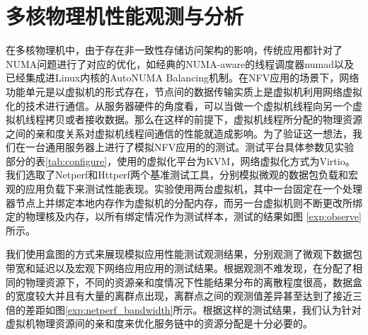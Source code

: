 \section{多核物理机性能观测与分析}
在多核物理机中，由于存在非一致性存储访问架构的影响，传统应用都针对了NUMA问题进行了对应的优化，如经典的NUMA-aware的线程调度器numad以及已经集成进Linux内核的AutoNUMA Balancing机制。在NFV应用的场景下，网络功能单元是以虚拟机的形式存在，节点间的数据传输实质上是虚拟机利用网络虚拟化的技术进行通信。从服务器硬件的角度看，可以当做一个虚拟机线程向另一个虚拟机线程拷贝或者接收数据。那么在这样的前提下，虚拟机线程所分配的物理资源之间的亲和度关系对虚拟机线程间通信的性能就造成影响。为了验证这一想法，我们在一台通用服务器上进行了模拟NFV应用的的测试。测试平台具体参数见实验部分的表\ref{tab:configure}，使用的虚拟化平台为KVM，网络虚拟化方式为Virtio。我们选取了Netperf和Httperf两个基准测试工具，分别模拟微观的数据包负载和宏观的应用负载下来测试性能表现。实验使用两台虚拟机，其中一台固定在一个处理器节点上并绑定本地内存作为虚拟机的分配内存，而另一台虚拟机则不断更改所绑定的物理核及内存，以所有绑定情况作为测试样本，测试的结果如图
\ref{exp:observe}所示。

我们使用盒图的方式来展现模拟应用性能测试观测结果，分别观测了微观下数据包带宽和延迟以及宏观下网络应用应用的测试结果。根据观测不难发现，在分配了相同的物理资源下，不同的资源亲和度情况下性能结果分布的离散程度很高，数据盒的宽度较大并且有大量的离群点出现，离群点之间的观测值差异甚至达到了接近三倍的差距如图\ref{exp:netperf_bandwidth}所示。根据这样的测试结果，我们认为针对虚拟机物理资源间的亲和度来优化服务链中的资源分配是十分必要的。

